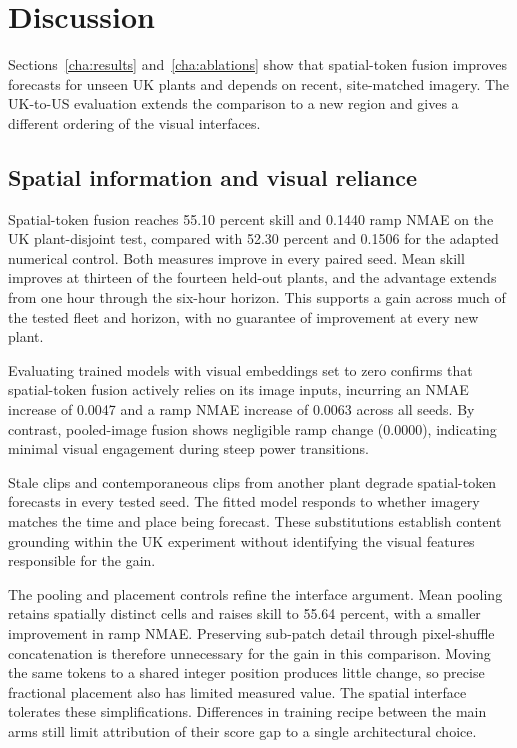 \chapter{Discussion}
\label{cha:discussion}

Sections~\ref{cha:results} and~\ref{cha:ablations} show that spatial-token fusion improves forecasts for unseen UK plants and depends on recent, site-matched imagery. The UK-to-US evaluation extends the comparison to a new region and gives a different ordering of the visual interfaces.

\section{Spatial information and visual reliance}

Spatial-token fusion reaches 55.10 percent skill and 0.1440 ramp NMAE on the UK plant-disjoint test, compared with 52.30 percent and 0.1506 for the adapted numerical control. Both measures improve in every paired seed. Mean skill improves at thirteen of the fourteen held-out plants, and the advantage extends from one hour through the six-hour horizon. This supports a gain across much of the tested fleet and horizon, with no guarantee of improvement at every new plant.

Evaluating trained models with visual embeddings set to zero confirms that spatial-token fusion actively relies on its image inputs, incurring an NMAE increase of 0.0047 and a ramp NMAE increase of 0.0063 across all seeds. By contrast, pooled-image fusion shows negligible ramp change (0.0000), indicating minimal visual engagement during steep power transitions.

Stale clips and contemporaneous clips from another plant degrade spatial-token forecasts in every tested seed. The fitted model responds to whether imagery matches the time and place being forecast. These substitutions establish content grounding within the UK experiment without identifying the visual features responsible for the gain.

The pooling and placement controls refine the interface argument. Mean pooling retains spatially distinct cells and raises skill to 55.64 percent, with a smaller improvement in ramp NMAE. Preserving sub-patch detail through pixel-shuffle concatenation is therefore unnecessary for the gain in this comparison. Moving the same tokens to a shared integer position produces little change, so precise fractional placement also has limited measured value. The spatial interface tolerates these simplifications. Differences in training recipe between the main arms still limit attribution of their score gap to a single architectural choice.

